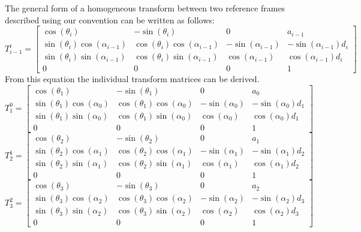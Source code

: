 \documentclass{article}
\begin{document}
The general form of a homogeneous transform between two reference frames described using our convention can be written as follows:
\[T_{i-1}^i =
\begin{bmatrix}
    \cos(\theta _i) & -\sin(\theta _i) & 0 & a_{i-1} \\
    \sin(\theta _i)\cos(\alpha _{i-1}) & \cos(\theta _i)\cos(\alpha _{i-1}) & -\sin(\alpha _{i-1}) & -\sin(\alpha _{i-1})d_i \\
    \sin(\theta _i)\sin(\alpha _{i-1}) & \cos(\theta _i)\sin(\alpha _{i-1}) & \cos(\alpha _{i-1}) & \cos(\alpha _{i-1})d_i \\
    0 & 0 & 0 & 1

\end{bmatrix}
\]
From this equation the individual transform matrices can be derived.
\[T_{1}^0 =
\begin{bmatrix}
    \cos(\theta _1) & -\sin(\theta _1) & 0 & a_{0} \\
    \sin(\theta _1)\cos(\alpha _{0}) & \cos(\theta _1)\cos(\alpha _{0}) & -\sin(\alpha _{0}) & -\sin(\alpha _{0})d_1 \\
    \sin(\theta _1)\sin(\alpha _{0}) & \cos(\theta _1)\sin(\alpha _{0}) & \cos(\alpha _{0}) & \cos(\alpha _{0})d_1 \\
    0 & 0 & 0 & 1

\end{bmatrix}
\]
\[T_{2}^1 =
\begin{bmatrix}
    \cos(\theta _2) & -\sin(\theta _2) & 0 & a_{1} \\
    \sin(\theta _2)\cos(\alpha _{1}) & \cos(\theta _2)\cos(\alpha _{1}) & -\sin(\alpha _{1}) & -\sin(\alpha _{1})d_2 \\
    \sin(\theta _2)\sin(\alpha _{1}) & \cos(\theta _2)\sin(\alpha _{1}) & \cos(\alpha _{1}) & \cos(\alpha _{1})d_2 \\
    0 & 0 & 0 & 1

\end{bmatrix}
\]
\[T_{3}^2 =
\begin{bmatrix}
    \cos(\theta _3) & -\sin(\theta _3) & 0 & a_{2} \\
    \sin(\theta _3)\cos(\alpha _{2}) & \cos(\theta _3)\cos(\alpha _{2}) & -\sin(\alpha _{2}) & -\sin(\alpha _{2})d_3 \\
    \sin(\theta _3)\sin(\alpha _{2}) & \cos(\theta _3)\sin(\alpha _{2}) & \cos(\alpha _{2}) & \cos(\alpha _{2})d_3 \\
    0 & 0 & 0 & 1

\end{bmatrix}
\]
\end{document}
